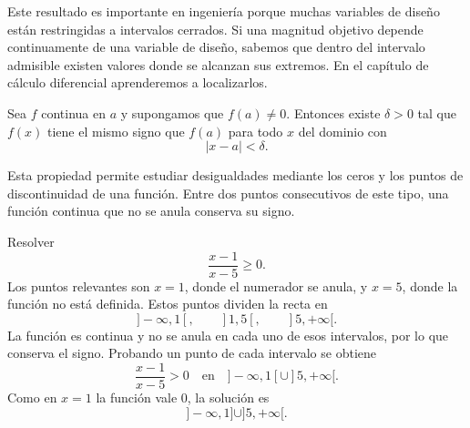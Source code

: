 Este resultado es importante en ingeniería porque muchas variables de diseño están restringidas a intervalos cerrados. Si una magnitud objetivo depende continuamente de una variable de diseño, sabemos que dentro del intervalo admisible existen valores donde se alcanzan sus extremos. En el capítulo de cálculo diferencial aprenderemos a localizarlos.

\begin{theorem}
Sea $f$ continua en $a$ y supongamos que $f(a)\neq0$. Entonces existe $\delta>0$ tal que $f(x)$ tiene el mismo signo que $f(a)$ para todo $x$ del dominio con
\[
|x-a|<\delta.
\]
\end{theorem}

Esta propiedad permite estudiar desigualdades mediante los ceros y los puntos de discontinuidad de una función. Entre dos puntos consecutivos de este tipo, una función continua que no se anula conserva su signo.

\begin{example}
Resolver
\[
\frac{x-1}{x-5}\geq0.
\]
Los puntos relevantes son $x=1$, donde el numerador se anula, y $x=5$, donde la función no está definida. Estos puntos dividen la recta en
\[
]-\infty,1[,\qquad ]1,5[,\qquad ]5,+\infty[.
\]
La función es continua y no se anula en cada uno de esos intervalos, por lo que conserva el signo. Probando un punto de cada intervalo se obtiene
\[
\frac{x-1}{x-5}>0\quad\text{en}\quad]-\infty,1[\cup]5,+\infty[.
\]
Como en $x=1$ la función vale $0$, la solución es
\[
]-\infty,1]\cup]5,+\infty[.
\]
\end{example}
